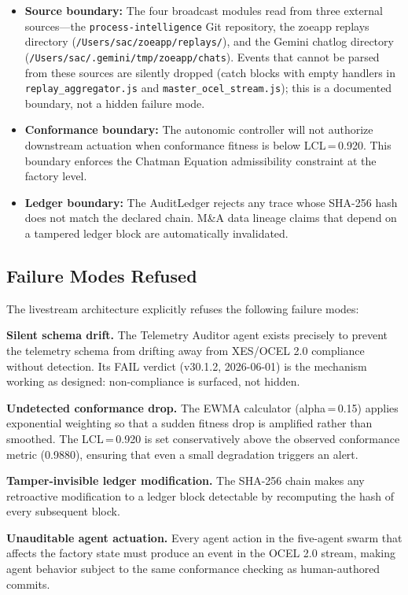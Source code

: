 \begin{itemize}
  \item \textbf{Source boundary:} The four broadcast modules read from three external
    sources---the \texttt{process-intelligence} Git repository, the zoeapp replays
    directory (\texttt{/Users/sac/zoeapp/replays/}), and the Gemini chatlog directory
    (\texttt{/Users/sac/.gemini/tmp/zoeapp/chats}). Events that cannot be parsed
    from these sources are silently dropped (catch blocks with empty handlers in
    \texttt{replay\_aggregator.js} and \texttt{master\_ocel\_stream.js}); this is
    a documented boundary, not a hidden failure mode.
  \item \textbf{Conformance boundary:} The autonomic controller will not authorize
    downstream actuation when conformance fitness is below LCL\,=\,0.920. This
    boundary enforces the Chatman Equation admissibility constraint at the factory
    level.
  \item \textbf{Ledger boundary:} The AuditLedger rejects any trace whose SHA-256
    hash does not match the declared chain. M\&A data lineage claims that depend on
    a tampered ledger block are automatically invalidated.
\end{itemize}

\subsection{Failure Modes Refused}
\label{sec:livestream-arch-failures}

The livestream architecture explicitly refuses the following failure modes:

\textbf{Silent schema drift.} The Telemetry Auditor agent exists precisely to prevent
the telemetry schema from drifting away from XES/OCEL 2.0 compliance without
detection. Its FAIL verdict (v30.1.2, 2026-06-01) is the mechanism working as
designed: non-compliance is surfaced, not hidden.

\textbf{Undetected conformance drop.} The EWMA calculator (alpha\,=\,0.15) applies
exponential weighting so that a sudden fitness drop is amplified rather than
smoothed. The LCL\,=\,0.920 is set conservatively above the observed conformance
metric (0.9880), ensuring that even a small degradation triggers an alert.

\textbf{Tamper-invisible ledger modification.} The SHA-256 chain makes any
retroactive modification to a ledger block detectable by recomputing the hash of
every subsequent block.

\textbf{Unauditable agent actuation.} Every agent action in the five-agent swarm
that affects the factory state must produce an event in the OCEL 2.0 stream, making
agent behavior subject to the same conformance checking as human-authored commits.
